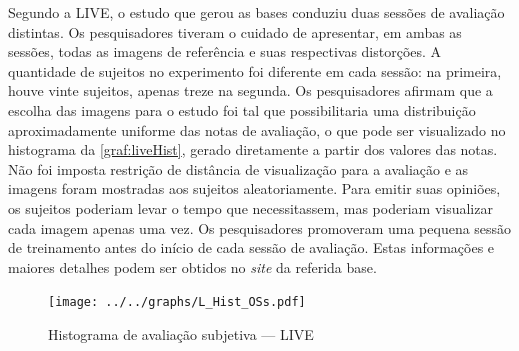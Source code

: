 Segundo a LIVE, o estudo que gerou as bases conduziu duas sessões de avaliação distintas. Os pesquisadores tiveram o cuidado de apresentar, em ambas as sessões, todas as imagens de referência e suas respectivas distorções. A quantidade de sujeitos no experimento foi diferente em cada sessão: na primeira, houve vinte sujeitos, apenas treze na segunda. Os pesquisadores afirmam que a escolha das imagens para o estudo foi tal que possibilitaria uma distribuição aproximadamente uniforme das notas de avaliação, o que pode ser visualizado no histograma da \autoref{graf:liveHist}, gerado diretamente a partir dos valores das notas. Não foi imposta restrição de distância de visualização para a avaliação e as imagens foram mostradas aos sujeitos aleatoriamente. Para emitir suas opiniões, os sujeitos poderiam levar o tempo que necessitassem, mas poderiam visualizar cada imagem apenas uma vez. Os pesquisadores promoveram uma pequena sessão de treinamento antes do início de cada sessão de avaliação. Estas informações e maiores detalhes podem ser obtidos no \emph{site} da referida base.\cite{livedb}

\begin{figure}[htb]
	\centering
	\begin{minipage}{.8\textwidth}
		\caption{Histograma de avaliação subjetiva  --- LIVE}\label{graf:liveHist}
		\centerline{\texttt{[image: ../../graphs/L\_Hist\_OSs.pdf]}}
	\end{minipage}
\end{figure}

